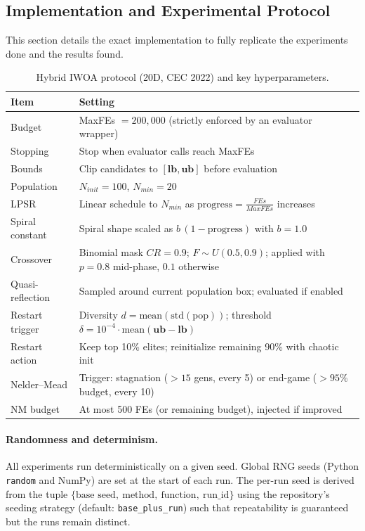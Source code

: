 \documentclass[conference]{IEEEtran}
\begin{document}
\subsection{Implementation and Experimental Protocol}
\label{sec:protocol}
This section details the exact implementation to fully replicate the experiments done and the results found.

\begin{table}[!t]
\caption{Hybrid IWOA protocol (20D, CEC 2022) and key hyperparameters.}
\label{tab:protocol}
\centering
\footnotesize
\setlength{\tabcolsep}{2pt}
\begin{tabular}{p{}p{}}
\toprule
\textbf{Item} & \textbf{Setting} \\
\midrule
Budget & MaxFEs $=200{,}000$ (strictly enforced by an evaluator wrapper) \\
Stopping & Stop when evaluator calls reach MaxFEs \\
Bounds & Clip candidates to $[\mathbf{lb},\mathbf{ub}]$ before evaluation \\
Population & $N_{init}=100$, $N_{min}=20$ \\
LPSR & Linear schedule to $N_{min}$ as $\mathrm{progress}=\tfrac{FEs}{MaxFEs}$ increases \\
Spiral constant & Spiral shape scaled as $b\,(1-\mathrm{progress})$ with $b=1.0$ \\
Crossover & Binomial mask $CR=0.9$; $F\sim U(0.5,0.9)$; applied with $p=0.8$ mid-phase, $0.1$ otherwise \\
Quasi-reflection & Sampled around current population box; evaluated if enabled \\
Restart trigger & Diversity $d=\mathrm{mean}(\mathrm{std}(\mathrm{pop}))$; threshold $\delta=10^{-4}\cdot \mathrm{mean}(\mathbf{ub}-\mathbf{lb})$ \\
Restart action & Keep top 10\% elites; reinitialize remaining 90\% with chaotic init \\
Nelder--Mead & Trigger: stagnation ($>15$ gens, every 5) or end-game ($>95\%$ budget, every 10) \\
NM budget & At most 500 FEs (or remaining budget), injected if improved \\
\bottomrule
\end{tabular}
\end{table}

\paragraph{Randomness and determinism.}
All experiments run deterministically on a given seed. Global RNG seeds (Python \texttt{random} and NumPy) are set at the start of each run. The per-run seed is derived from the tuple \(\{\text{base seed},\ \text{method},\ \text{function},\ \text{run\_id}\}\) using the repository's seeding strategy (default: \texttt{base\_plus\_run}) such that repeatability is guaranteed but the runs remain distinct.
\end{document}
